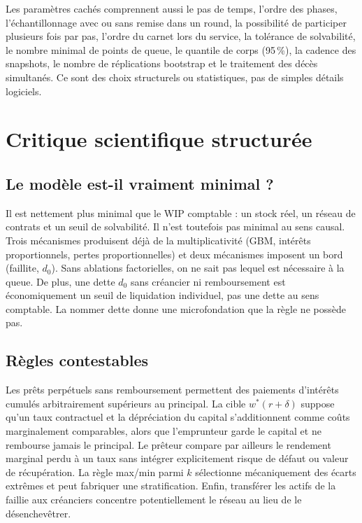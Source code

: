 \documentclass[11pt,a4paper]{article}
\begin{document}
Les paramètres cachés comprennent aussi le pas de temps, l'ordre des phases,
l'échantillonnage avec ou sans remise dans un round, la possibilité de participer
plusieurs fois par pas, l'ordre du carnet lors du service, la tolérance de
solvabilité, le nombre minimal de points de queue, le quantile de corps (95\,\%),
la cadence des snapshots, le nombre de réplications bootstrap et le traitement
des décès simultanés. Ce sont des choix structurels ou statistiques, pas de
simples détails logiciels.

\section{Critique scientifique structurée}

\subsection{Le modèle est-il vraiment minimal ?}

Il est nettement plus minimal que le WIP comptable : un stock réel, un réseau de
contrats et un seuil de solvabilité. Il n'est toutefois pas minimal au sens
causal. Trois mécanismes produisent déjà de la multiplicativité (GBM, intérêts
proportionnels, pertes proportionnelles) et deux mécanismes imposent un bord
(faillite, $d_0$). Sans ablations factorielles, on ne sait pas lequel est
nécessaire à la queue. De plus, une dette $d_0$ sans créancier ni remboursement
est économiquement un seuil de liquidation individuel, pas une dette au sens
comptable. La nommer dette donne une microfondation que la règle ne possède pas.

\subsection{Règles contestables}

Les prêts perpétuels sans remboursement permettent des paiements d'intérêts
cumulés arbitrairement supérieurs au principal. La cible $w^*(r+\delta)$ suppose
qu'un taux contractuel et la dépréciation du capital s'additionnent comme coûts
marginalement comparables, alors que l'emprunteur garde le capital et ne rembourse
jamais le principal. Le prêteur compare par ailleurs le rendement marginal perdu
à un taux sans intégrer explicitement risque de défaut ou valeur de récupération.
La règle max/min parmi $k$ sélectionne mécaniquement des écarts extrêmes et peut
fabriquer une stratification. Enfin, transférer les actifs de la faillie aux
créanciers concentre potentiellement le réseau au lieu de le désenchevêtrer.
\end{document}
